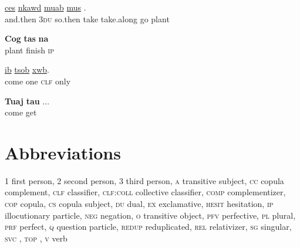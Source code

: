 \documentclass[output=paper]{LSP/langsci}
\begin{document}
\begin{exe}
\ex \label{JaexApp29}
\gll  \underline{ces}  \underline{nkawd}  \underline{}  \underline{muab}  \underline{}  \underline{mus}  \underline{}.\\
     and.then 3\textsc{du} so.then take take.along go plant\\
\glt {}
\end{exe}

\begin{exe}
\ex \label{JaexApp30}
\gll \textbf{Cog} \textbf{tas} \textbf{na}\\
     plant finish \textsc{ip}\\
\glt {}
\end{exe}


\begin{exe}
\ex \label{JaexApp31}
\gll \underline{} \underline{ib} \underline{tsob} \underline{xwb}.\\
     come one \textsc{clf} only\\
\glt {}
\end{exe}

\begin{exe}
\ex \label{JaexApp32}
\gll \textbf{Tuaj} \textbf{tau} ...\\
     come get\\
\glt {}
\end{exe}

\section*{Abbreviations}
\textsc{1}		first person,
\textsc{2}		second person,
\textsc{3} 		third person,
\textsc{a}		transitive subject,
\textsc{cc}		copula complement,
\textsc{clf}		classifier,
\textsc{clf:coll}		collective classifier,
\textsc{comp}		complementizer,
\textsc{cop}		copula,
\textsc{cs}		copula subject,
\textsc{du}		dual,
\textsc{ex}		exclamative,
\textsc{hesit}		hesitation,
\textsc{ip}		illocutionary particle,
\textsc{neg}		negation,
\textsc{o}		transitive object,
\textsc{pfv}		perfective,
\textsc{pl}		plural,
\textsc{prf}		perfect,
\textsc{q}		question particle,
\textsc{redup}		reduplicated,
\textsc{rel}		relativizer,
\textsc{sg}		singular,
\textsc{svc}	,
\textsc{top}		,
\textsc{v}	verb
\end{document}
